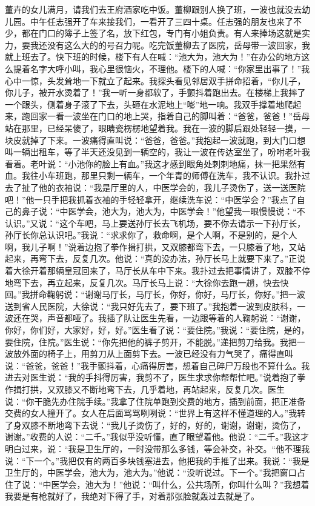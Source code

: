 \documentclass[12pt,oneside]{book}
\begin{document}
董卉的女儿满月，请我们去王府酒家吃中饭。董柳跟别人换了班，一波也就没去幼儿园。中午任志强开了车来接我们，一看开了三四十桌。任志强的朋友也来了不少，都在门口的簿子上签了名，放下红包，专门有小姐负责。有人来捧场这就是实力，要我还没有这么大的的号召力呢。吃完饭董柳去了医院，岳母带一波回家，我就上班去了。快下班的时候，楼下有人在喊：``池大为，池大为！''在办公的地方这么提着名字大呼小叫，我心里很恼火，不理他。楼下的人喊：``你家里出事了！''我心中一惊，头发耸地一下就立了起来。我探头看见邻居双手拼命招着，``你儿子，你儿子，被开水烫着了！''我一听一身都软了，手颤抖着跑出去。在楼梯上我摔了一个跟头，侧着身子滚了下去，头砸在水泥地上``嘭''地一响。我双手撑着地爬起来，跑回家一看一波坐在门口的地上哭，指着自己的脚叫着：``爸爸，爸爸！''岳母站在那里，已经呆傻了，眼睛瓷楞楞地望着我。我在一波的脚后跟处轻轻一摸，一块皮就掉了下来。一波痛得直叫说：``爸爸，爸爸。''我抱起一波就跑，到大门口想叫一辆出租车，等了半天还没见到一辆空的，我让一波在传达室坐了，吩咐老叶我看着。老叶说：``小池你的脸上有血。''我这才感到眼角处刺刺地痛，抹一把果然有血。我往小车班跑，那里只剩一辆车，一个年青的师傅在洗车，我不认识。我扑过去了扯了他的衣袖说：``我是厅里的人，中医学会的，我儿子烫伤了，送一送医院吧！''他一只手把我抓着衣袖的手轻轻拿开，继续洗车说：``中医学会？''我点了自己的鼻子说：``中医学会，池大为，池大为，中医学会！''他望我一眼慢慢说：``不认识。''又说：``这个车吧，马上要送孙厅长去飞机场，要不你去请示一下孙厅长，孙厅长你总认识吧。''我说：``求求你了，救命啊，是个人啊，不是别的，是个人啊，我儿子啊！''说着边抱了拳作揖打拱，又双膝都弯下去，一只膝着了地，又站起来，再弯下去，反复几次。他说：``真的没办法，孙厅长马上就要下来了。''正说着大徐开着那辆皇冠回来了，马厅长从车中下来。我扑过去把事情讲了，双膝不停地弯下去，再立起来，反复几次。马厅长马上说：``大徐你去跑一趟，快去快回。''我拼命鞠躬说：``谢谢马厅长，马厅长，你好，你好，马厅长，你好。''把一波送到省人民医院，大徐说：``我只好先去了，要下班了。''我抱着一波到皮肤科，一波还在哭，声音都哑了。我插了队让医生先看，一边跟等着的人鞠躬说：``谢谢，你好，你们好，大家好，好，好。''医生看了说：``要住院。''我说：``要住院，是的，要住院，住院。''医生说：``你先把他的裤子剪开，不能脱。''递把剪刀给我。我把一波放外面的椅子上，用剪刀从上面剪下去。一波已经没有力气哭了，痛得直叫说：``爸爸，爸爸！''我手颤抖着，心痛得厉害，想着自己碎尸万段也不算什么。我进去对医生说：``我的手抖得厉害，我剪不了，医生求求你帮帮忙吧。''说着抱了拳作揖打拱，又双膝又不断地弯下去，几乎着地，再站起来，反复几次。医生说：``你干脆先办住院手续。''我拿了住院单跑到交费的地方，插到前面，把正准备交费的女人撞开了。女人在后面骂骂咧咧说：``世界上有这样不懂道理的人。''我转了身双膝不断地弯下去说：``我儿子烫伤了，好的，好的，谢谢，谢谢，烫伤了，谢谢。''收费的人说：``二千。''我似乎没听懂，直了眼望着他。他说：``二千。''我这才明白过来，说：``我是卫生厅的，一时没带那么多钱，等会补交，补交。``他不理我说：``下一个。''我把仅有的两百多块钱塞进去，他把我的手推了出来。我说：``我是卫生厅的，中医学会，池大为，池大为。''他说：``没听说过。下一个。''我把窗口占住了说：``中医学会，池大为！''他说：``叫什么，公共场所，你叫什么叫？''我想着我要是有枪就好了，我绝对下得了手，对着那张脸就轰过去就是了。
\end{document}
